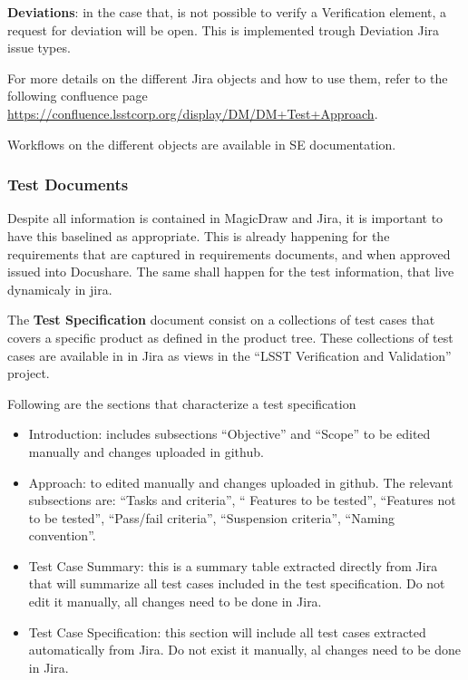 {\bf Deviations}: in the case that, is not possible to verify a Verification element, a request for deviation will be open. This is implemented trough Deviation Jira issue types.

For more details on the different Jira objects and how to use them, refer to the following confluence page 
\url{https://confluence.lsstcorp.org/display/DM/DM+Test+Approach}.

Workflows on the different objects are available in SE documentation.


\subsubsection{Test Documents}

Despite all information is contained in MagicDraw and Jira, it is important to have this baselined as appropriate. This is already happening for the requirements that are captured in requirements documents, and when approved issued into Docushare.
The same shall happen for the test information, that live dynamicaly in jira.

The {\bf Test Specification} document consist on a collections of test cases that covers a specific \product{} product as defined in the product tree. These collections of test cases are available in in Jira as views in the ``LSST Verification and Validation'' project.

Following are the sections that characterize a test specification

\begin{itemize}
\item Introduction: includes subsections ``Objective'' and ``Scope'' to be edited manually and changes uploaded in github.
\item Approach: to edited manually and changes uploaded in github. The relevant subsections are: ``Tasks and criteria'', `` Features to be tested'', ``Features not to be tested'', ``Pass/fail criteria'', ``Suspension criteria'', ``Naming convention''.
\item Test Case Summary: this is a summary table extracted directly from Jira that will summarize all test cases included in the test specification. Do not edit it manually, all changes need to be done in Jira.
\item Test Case Specification: this section will include all test cases extracted automatically from Jira. Do not exist it manually, al changes need to be done in Jira.
\end{itemize}

